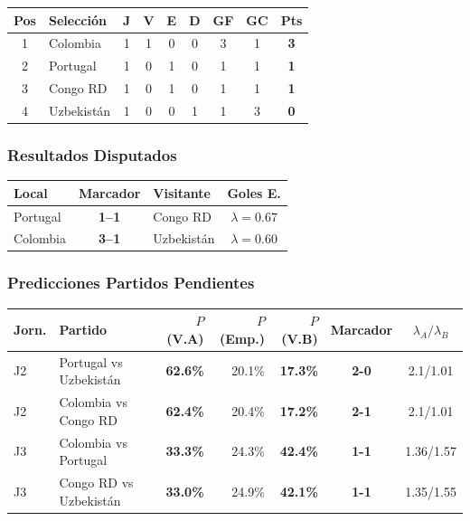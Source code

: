 \documentclass[11pt,a4paper]{article}
\newcommand{\prob}[1]{\textbf{#1\%}}
\begin{document}
\begin{center}
\begin{tabular}{@{}clccccccc@{}}
\toprule
\textbf{Pos} & \textbf{Selección} & \textbf{J} & \textbf{V} & \textbf{E} & \textbf{D} & \textbf{GF} & \textbf{GC} & \textbf{Pts} \\
\midrule
  \cellcolor{green!25}1 & \cellcolor{green!25}Colombia & 1 & 1 & 0 & 0 & 3 & 1 & \textbf{3} \\
  \cellcolor{green!25}2 & \cellcolor{green!25}Portugal & 1 & 0 & 1 & 0 & 1 & 1 & \textbf{1} \\
  \cellcolor{yellow!20}3 & \cellcolor{yellow!20}Congo RD & 1 & 0 & 1 & 0 & 1 & 1 & \textbf{1} \\
  4 & Uzbekistán & 1 & 0 & 0 & 1 & 1 & 3 & \textbf{0} \\
\bottomrule
\end{tabular}
\end{center}

\subsubsection*{Resultados Disputados}

\begin{center}
\begin{tabular}{@{}lclc@{}}
\toprule
\textbf{Local} & \textbf{Marcador} & \textbf{Visitante} & \textbf{Goles E.} \\
\midrule
  Portugal & \textbf{1--1} & Congo RD & $\lambda=0.67$ \\
  Colombia & \textbf{3--1} & Uzbekistán & $\lambda=0.60$ \\
\bottomrule
\end{tabular}
\end{center}

\subsubsection*{Predicciones Partidos Pendientes}


\begin{center}
\begin{tabular}{@{}llrrrcc@{}}
\toprule
\textbf{Jorn.} & \textbf{Partido} & \textbf{$P$(V.A)} & \textbf{$P$(Emp.)} & \textbf{$P$(V.B)} & \textbf{Marcador} & \textbf{$\lambda_A/\lambda_B$} \\
\midrule
  J2 & Portugal vs Uzbekistán & \cellcolor{yellow!30}\prob{62.6} & 20.1\% & \cellcolor{red!15}\prob{17.3} & \textbf{2-0} & 2.1/1.01 \\
  J2 & Colombia vs Congo RD & \cellcolor{yellow!30}\prob{62.4} & 20.4\% & \cellcolor{red!15}\prob{17.2} & \textbf{2-1} & 2.1/1.01 \\
  J3 & Colombia vs Portugal & \cellcolor{red!15}\prob{33.3} & 24.3\% & \cellcolor{red!15}\prob{42.4} & \textbf{1-1} & 1.36/1.57 \\
  J3 & Congo RD vs Uzbekistán & \cellcolor{red!15}\prob{33.0} & 24.9\% & \cellcolor{red!15}\prob{42.1} & \textbf{1-1} & 1.35/1.55 \\
\bottomrule
\end{tabular}
\end{center}
\end{document}
